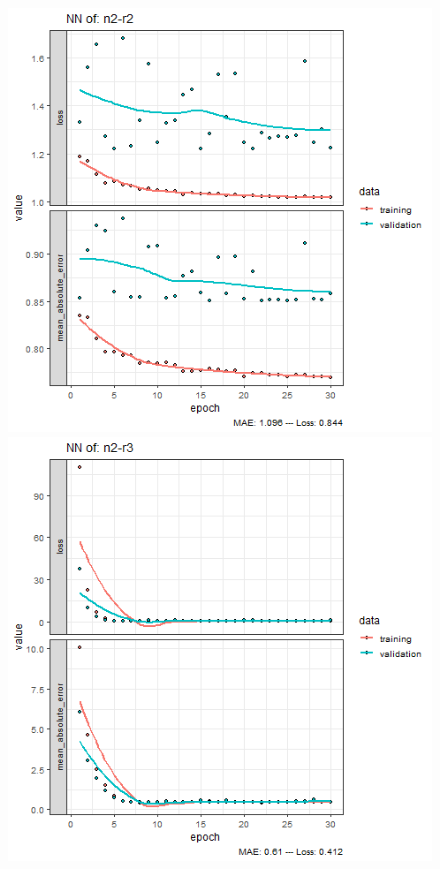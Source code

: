 \documentclass{FR16}
\begin{document}
\begin{figure}[!htb]
\begin{minipage}{0.33\textwidth}
   \end{minipage}
   \begin{minipage}{0.33\textwidth}
     \centering
     \includegraphics[width=1\linewidth]{figures/NN-n2-r2.png}
   \end{minipage}
 \begin{minipage}{0.33\textwidth}
     \centering
     \includegraphics[width=1\linewidth]{figures/NN-n2-r3.png} 

\end{minipage}
\end{figure}
\end{document}
